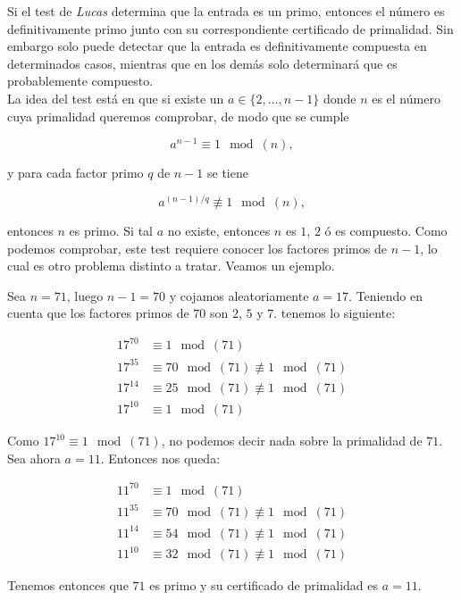Si el test de \textit{Lucas} determina que la entrada es un primo, entonces el número es definitivamente primo junto con su correspondiente certificado de primalidad. Sin embargo solo puede detectar que la entrada es definitivamente compuesta en determinados casos, mientras que en los demás solo determinará que es probablemente compuesto.\\

La idea del test está en que si existe un $a \in \{2,\dotso, n-1\}$ donde $n$ es el número cuya primalidad queremos comprobar, de modo que se cumple

\begin{equation}
a^{n-1} \equiv 1 \mod(n),
\end{equation}

y para cada factor primo $q$ de $n-1$ se tiene

\begin{equation}
a^{(n-1)/q} \not\equiv 1 \mod(n),
\end{equation}

entonces $n$ es primo. Si tal $a$ no existe, entonces $n$ es $1$, $2$ ó es compuesto. Como podemos comprobar, este test requiere conocer los factores primos de $n-1$, lo cual es otro problema distinto a tratar. Veamos un ejemplo.

\begin{ejemplo}
	Sea $n = 71$, luego $n-1 = 70$ y cojamos aleatoriamente $a = 17$. Teniendo en cuenta que los factores primos de $70$ son $2$, $5$ y $7$. tenemos lo siguiente:
	
	\begin{align}
	17^{70} &\equiv 1 \mod(71)\\
	17^{35} &\equiv 70 \mod(71) \not\equiv 1 \mod(71)\\
	17^{14} &\equiv 25 \mod(71) \not\equiv 1 \mod(71)\\
	17^{10} &\equiv 1 \mod(71)
	\end{align}
	
	Como $17^10 \equiv 1 \mod(71)$, no podemos decir nada sobre la primalidad de $71$. Sea ahora $a = 11$. Entonces nos queda:
	
	\begin{align}
	11^{70} &\equiv 1 \mod(71)\\
	11^{35} &\equiv 70 \mod(71) \not\equiv 1 \mod(71)\\
	11^{14} &\equiv 54 \mod(71) \not\equiv 1 \mod(71)\\
	11^{10} &\equiv 32 \mod(71) \not\equiv 1 \mod(71)
	\end{align}
	
	Tenemos entonces que $71$ es primo y su certificado de primalidad es $a = 11$.
\end{ejemplo}

